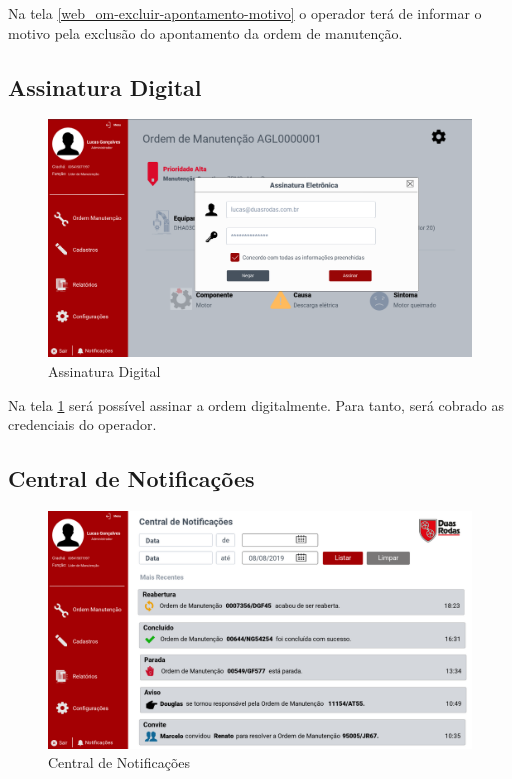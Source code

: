 Na tela \ref{web_om-excluir-apontamento-motivo} o operador terá de informar o motivo pela exclusão do apontamento da ordem de manutenção.

\newpage
\subsection{Assinatura Digital}

\begin{figure}[htb]
	\caption{\label{web_om-assinatura}Assinatura Digital}
	\begin{center}
		\includegraphics[scale=0.40]{./Figuras/web/om-assinatura.png}
	\end{center}
\end{figure}

Na tela \ref{web_om-assinatura} será possível assinar a ordem digitalmente. Para tanto, será cobrado as credenciais do operador.

\newpage
\subsection{Central de Notificações}

\begin{figure}[htb]
	\caption{\label{web_central-notificacoes}Central de Notificações}
	\begin{center}
		\includegraphics[scale=0.40]{./Figuras/web/central-notificacoes.png}
	\end{center}
\end{figure}

